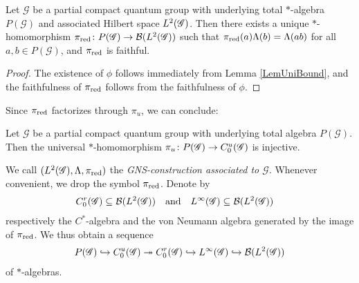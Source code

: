 \begin{Prop} \label{prop:gns} Let $\mathscr{G}$ be a partial compact
  quantum group with underlying total $*$-algebra $P(\mathscr{G})$ and
  associated Hilbert space $L^{2}(\mathscr{G})$. Then there exists a unique
  $*$-homomorphism $\pi_{\operatorname{\mathrm{red}}}\colon P(\mathscr{G}) \to {\cal B}(L^{2}(\mathscr{G}))$
  such that $\pi_{\operatorname{\mathrm{red}}}(a)\Lambda(b)=\Lambda(ab)$ for all $a,b\in
  P(\mathscr{G})$, and $\pi_{\operatorname{\mathrm{red}}}$ is faithful.
\end{Prop}
\begin{proof} The existence of $\phi$ follows immediately from Lemma \ref{LemUniBound}, and the faithfulness of $\pi_{\operatorname{\mathrm{red}}}$ follows from the faithfulness of $\phi$. 
\end{proof}
Since $\pi_{\operatorname{\mathrm{red}}}$ factorizes through $\pi_{u}$, we can conclude:
\begin{Cor}
  Let $\mathscr{G}$ be a partial compact quantum group with underlying
  total algebra $P(\mathscr{G})$. Then the
universal $*$-homomorphism $\pi_{u} \colon P(\mathscr{G}) \to C^{u}_{0}(\mathscr{G})$ is injective.
\end{Cor}

We call $(L^{2}(\mathscr{G}),\Lambda,\pi_{\operatorname{\mathrm{red}}})$ the \emph{GNS-construction associated
  to $\mathscr{G}$}. Whenever convenient, we drop the symbol $\pi_{\operatorname{\mathrm{red}}}$. Denote by
\begin{align}
  C^{r}_{0}(\mathscr{G}) &\subseteq {\cal B}(L^{2}(\mathscr{G})) &&\text{and} & L^{\infty}(\mathscr{G}) &\subseteq {\cal B}(L^{2}(\mathscr{G}))
\end{align}
respectively the $C^{*}$-algebra and the von Neumann algebra generated by the image
of $\pi_{\operatorname{\mathrm{red}}}$. We thus obtain a sequence
\begin{align*}
P(\mathscr{G}) \hookrightarrow C^{u}_{0}(\mathscr{G}) \twoheadrightarrow
  C^{r}_{0}(\mathscr{G})\hookrightarrow
L^{\infty}(\mathscr{G}) \hookrightarrow {\cal B}(L^{2}(\mathscr{G}))
\end{align*}
of $*$-algebras.


